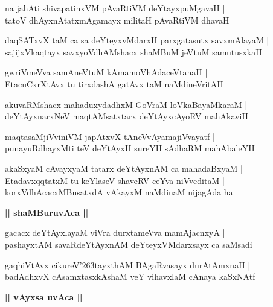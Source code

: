 \documentclass[twoside,12pt,openright]{book}
\def\S{\char'263}
\newcounter{shloka}[chapter]
\def\uvaca#1{\centerline{{\large\textbf{#1}}}}
\begin{document}
\begin{shloka}%
na jahAti shivapatinxVM pAvaRtiVM deYtayxpuMgavaH |\\
tatoV dhAyxnAtatxmAgamayx militaH pAvaRtiVM dhavaH 	
\end{shloka}

\begin{shloka}%
daqSATxvX taM ca sa deYteyxvMdarxH parxgatasutx savxmAlayaM |\\
sajijxVkaqtayx savxyoVdhAMshacx shaMBuM jeVtuM samutusxkaH 
\end{shloka}

\begin{shloka}%
gwriVmeVva samAneVtuM kAmamoVhAdaceVtanaH |\\
EtacuCxrXtAvx tu tirxdashA gatAvx taM naMdineVritAH 
\end{shloka}

\begin{shloka}%
akuvaRMshacx mahaduxydadhxM GoVraM loVkaBayaMkaraM |\\
deYtAyxnarxNeV maqtAMsatxtarx deYtAyxcAyoRV mahAkaviH 
\end{shloka}

\begin{shloka}%
maqtasaMjiVviniVM japAtxvX tAneVvAyamajiVvayatf |\\
punayuRdhayxMti teV deYtAyxH sureYH sAdhaRM mahAbaleYH 
\end{shloka}

\begin{shloka}%
akaSxyaM cAvayxyaM tatarx deYtAyxnAM ca mahadaBxyaM |\\
EtadavxqqtatxM tu keYlaseV shaveRV ceYva niVveditaM |\\
korxVdhAcacxMBusatxdA vAkayxM naMdinaM nijagAda ha 
\end{shloka}

\uvaca{|| shaMBuruvAca ||}

\begin{shloka}%
gacacx deYtAyxlayaM viVra durxtameVva mamAjacnxyA |\\
pashayxtAM savaRdeYtAyxnAM deYteyxVMdarxsayx ca saMsadi
\end{shloka}

\begin{shloka}%
gaqhiVtAvx cikureV\S tayxthAM BAgaRvasayx durAtAmxnaH |\\
badAdhxvX cAsamxtasxkAshaM veY vihavxlaM cAnaya kaSxNAtf
\end{shloka}

\uvaca{|| vAyxsa uvAca ||}
\end{document}
